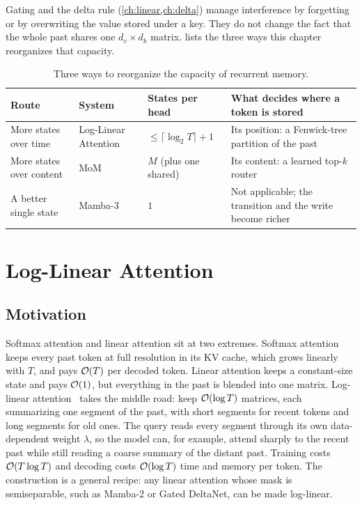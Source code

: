 Gating and the delta rule (\cref{ch:linear,ch:delta}) manage interference by forgetting or by
overwriting the value stored under a key. They do not change the fact that the whole past
shares one $d_v\times d_k$ matrix.  lists the three ways this chapter
reorganizes that capacity.

\begin{table}[t]
\centering\small
\caption{Three ways to reorganize the capacity of recurrent memory.}
\label{tab:c07-routes}
\begin{tabularx}{\textwidth}{@{}l l l X@{}}
\toprule
Route & System & States per head & What decides where a token is stored \\
\midrule
More states over time & Log-Linear Attention & $\le \lceil\log_2 T\rceil + 1$ & Its position: a Fenwick-tree partition of the past \\
More states over content & MoM & $M$ (plus one shared) & Its content: a learned top-$k$ router \\
A better single state & Mamba-3 & $1$ & Not applicable; the transition and the write become richer \\
\bottomrule
\end{tabularx}
\end{table}

\section{Log-Linear Attention}\label{sec:c07-loglinear}

\subsection{Motivation}

Softmax attention and linear attention sit at two extremes. Softmax attention keeps every
past token at full resolution in its KV cache, which grows linearly with $T$, and pays
$\mathcal{O}(T)$ per decoded token. Linear attention keeps a constant-size state and pays
$\mathcal{O}(1)$, but everything in the past is blended into one matrix. Log-linear
attention~\citep{guo2025loglinear} takes the middle road: keep $\mathcal{O}(\log T)$ matrices, each
summarizing one segment of the past, with short segments for recent tokens and long
segments for old ones. The query reads every segment through its own data-dependent weight
$\lambda$, so the model can, for example, attend sharply to the recent past while still
reading a coarse summary of the distant past. Training costs $\mathcal{O}(T\log T)$ and decoding
costs $\mathcal{O}(\log T)$ time and memory per token. The construction is a general recipe: any
linear attention whose mask is semiseparable, such as Mamba-2 or Gated DeltaNet, can be made
log-linear.

